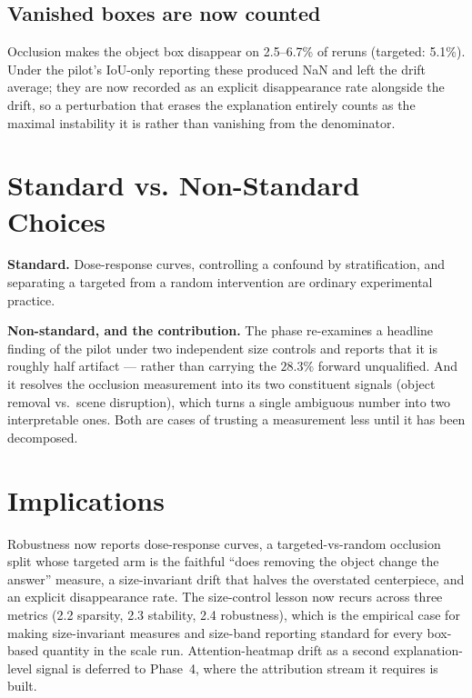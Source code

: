 \subsection{Vanished boxes are now counted}

Occlusion makes the object box disappear on 2.5--6.7\% of reruns (targeted: 5.1\%). Under the pilot's
IoU-only reporting these produced NaN and left the drift average; they are now recorded as an explicit
disappearance rate alongside the drift, so a perturbation that erases the explanation entirely counts
as the maximal instability it is rather than vanishing from the denominator.

\section{Standard vs. Non-Standard Choices}

\textbf{Standard.} Dose-response curves, controlling a confound by stratification, and separating a
targeted from a random intervention are ordinary experimental practice.

\textbf{Non-standard, and the contribution.} The phase re-examines a headline finding of the pilot
under two independent size controls and reports that it is roughly half artifact --- rather than
carrying the $28.3\%$ forward unqualified. And it resolves the occlusion measurement into its two
constituent signals (object removal vs.\ scene disruption), which turns a single ambiguous number into
two interpretable ones. Both are cases of trusting a measurement less until it has been decomposed.

\section{Implications}

Robustness now reports dose-response curves, a targeted-vs-random occlusion split whose targeted arm is
the faithful ``does removing the object change the answer'' measure, a size-invariant drift that
halves the overstated centerpiece, and an explicit disappearance rate. The size-control lesson now
recurs across three metrics (2.2 sparsity, 2.3 stability, 2.4 robustness), which is the empirical case
for making size-invariant measures and size-band reporting standard for every box-based quantity in the
scale run. Attention-heatmap drift as a second explanation-level signal is deferred to Phase~4, where
the attribution stream it requires is built.
